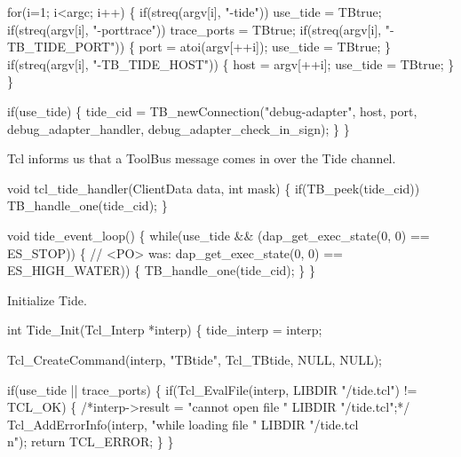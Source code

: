   for(i=1; i<argc; i++) \{
    if(streq(argv[i], "-tide"))
      use_tide = TBtrue;
    if(streq(argv[i], "-porttrace"))
      trace_ports = TBtrue;
    if(streq(argv[i], "-TB_TIDE_PORT")) \{
      port = atoi(argv[++i]);
      use_tide = TBtrue;
    \}
    if(streq(argv[i], "-TB_TIDE_HOST")) \{
      host = argv[++i];
      use_tide = TBtrue;
    \}
  \}

  if(use_tide) \{
    tide_cid = TB_newConnection("debug-adapter", host, port, 
                        debug_adapter_handler, debug_adapter_check_in_sign);
  \}
\}
\nwendcode{}\nwdocspar


Tcl informs us that a ToolBus message comes in over the Tide channel.

\nwenddocs{}\endmoddef\let\nwnotused=\nwoutput{}
void tcl_tide_handler(ClientData data, int mask)
\{
  if(TB_peek(tide_cid))
    TB_handle_one(tide_cid);
\}
\nwendcode{}\nwdocspar


\nwenddocs{}\endmoddef\let\nwnotused=\nwoutput{}
void tide_event_loop()
\{
  while(use_tide && (dap_get_exec_state(0, 0) == ES_STOP)) \{
 // <PO> was:       dap_get_exec_state(0, 0) == ES_HIGH_WATER)) \{
    TB_handle_one(tide_cid);
  \}
\}
\nwendcode{}\nwdocspar


Initialize Tide.

\nwenddocs{}\endmoddef\let\nwnotused=\nwoutput{}
int Tide_Init(Tcl_Interp *interp)
\{
  tide_interp = interp;

  Tcl_CreateCommand(interp, "TBtide", Tcl_TBtide, NULL, NULL);

  if(use_tide || trace_ports) \{
    if(Tcl_EvalFile(interp, LIBDIR "/tide.tcl") != TCL_OK) \{
      /*interp->result = "cannot open file " LIBDIR "/tide.tcl";*/
      Tcl_AddErrorInfo(interp, "while loading file " LIBDIR "/tide.tcl\\n");
      return TCL_ERROR;
    \}
  \}

